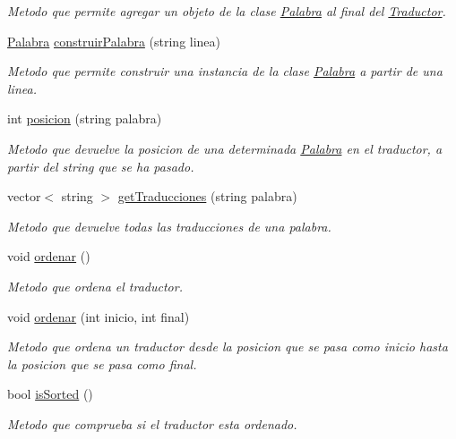 \begin{DoxyCompactItemize}
\begin{DoxyCompactList}\small\item\em \-Metodo que permite agregar un objeto de la clase \hyperlink{classPalabra}{\-Palabra} al final del \hyperlink{classTraductor}{\-Traductor}. \end{DoxyCompactList}\item 
\hyperlink{classPalabra}{\-Palabra} \hyperlink{classTraductor_a115c863aaea24bf8f29ea99ebfacd962}{construir\-Palabra} (string linea)
\begin{DoxyCompactList}\small\item\em \-Metodo que permite construir una instancia de la clase \hyperlink{classPalabra}{\-Palabra} a partir de una linea. \end{DoxyCompactList}\item 
int \hyperlink{classTraductor_a19c3c3db8f3a9e31c005b0ddaf284f12}{posicion} (string palabra)
\begin{DoxyCompactList}\small\item\em \-Metodo que devuelve la posicion de una determinada \hyperlink{classPalabra}{\-Palabra} en el traductor, a partir del string que se ha pasado. \end{DoxyCompactList}\item 
vector$<$ string $>$ \hyperlink{classTraductor_ab460e555e11aa1749b3567e892ddefbf}{get\-Traducciones} (string palabra)
\begin{DoxyCompactList}\small\item\em \-Metodo que devuelve todas las traducciones de una palabra. \end{DoxyCompactList}\item 
void \hyperlink{classTraductor_a6ce92313df406af23dfd9a90f1b8cf8c}{ordenar} ()
\begin{DoxyCompactList}\small\item\em \-Metodo que ordena el traductor. \end{DoxyCompactList}\item 
void \hyperlink{classTraductor_a6b0d7220ace948f001a0f20dade25cdd}{ordenar} (int inicio, int final)
\begin{DoxyCompactList}\small\item\em \-Metodo que ordena un traductor desde la posicion que se pasa como inicio hasta la posicion que se pasa como final. \end{DoxyCompactList}\item 
bool \hyperlink{classTraductor_a9ba8f01b94d7a1913ad118c26fb80414}{is\-Sorted} ()
\begin{DoxyCompactList}\small\item\em \-Metodo que comprueba si el traductor esta ordenado. \end{DoxyCompactList}\end{DoxyCompactItemize}
